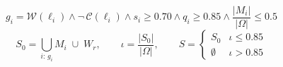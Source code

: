 \documentclass[varwidth=17cm,border=10pt]{standalone}
\begin{document}
\Large
$$g_i=\mathcal W(\ell_i)\wedge\neg\,\mathcal C(\ell_i)\wedge s_i\ge 0.70\wedge q_i\ge 0.85\wedge\frac{|M_i|}{|\Omega|}\le 0.5$$
$$S_0=\bigcup_{i:\,g_i}M_i\;\cup\;W_r,\qquad \iota=\frac{|S_0|}{|\Omega|},\qquad S=\begin{cases}S_0&\iota\le 0.85\\ \emptyset&\iota>0.85\end{cases}$$
\end{document}
